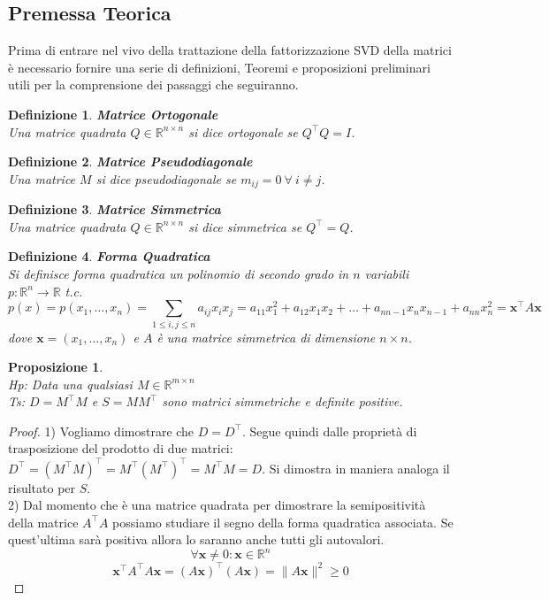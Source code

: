 \documentclass[11pt]{article}
\newtheorem{proposition}{Proposizione}
\newtheorem{definition}{Definizione}
\newcommand{\R}{\mathbb{R}} %
\begin{document}
\subsection{Premessa Teorica}
Prima di entrare nel vivo della trattazione della fattorizzazione SVD della matrici è necessario fornire una serie di definizioni, Teoremi e proposizioni preliminari utili per la comprensione dei passaggi che seguiranno.
\begin{definition}
    \textbf{Matrice Ortogonale}\\ Una matrice quadrata $Q\in\mathbb{R}^{n \times n}$ si dice ortogonale se $Q^\top      Q=I$.
\end{definition}
\begin{definition}
	\textbf{Matrice Pseudodiagonale}\\ Una matrice $M$ si dice pseudodiagonale se $m_{ij}=0 \ \forall \ i\neq j$.
\end{definition}
\begin{definition}
    \textbf{Matrice Simmetrica}\\ Una matrice quadrata $Q\in\mathbb{R}^{n \times n}$ si dice simmetrica se $Q^\top      =Q$.
\end{definition}
\begin{definition}
    \textbf{Forma Quadratica}\\ Si definisce forma quadratica un polinomio di secondo grado in $n$ variabili $p: \mathbb{R}^n \rightarrow \mathbb{R}$ t.c.
    \[
    p(x)=p(x_1,\dots,x_n)=\sum_{1 \leq i,j \leq n}a_{ij}x_ix_j=a_{11}x_1^2+a_{12}x_1x_2 + \dots + a_{nn-1}x_nx_{n-1}+a_{nn}x_n^2=\mathbf{x}^\top      A\mathbf{x}
    \]
    dove $\mathbf{x} = (x_1, \dots, x_n)$ e $A$ è una matrice simmetrica di dimensione $n \times n$.
\end{definition}
\begin{proposition}\label{prop 1}
\textbf{}\\
\textit{Hp:} Data una qualsiasi $M\in\mathbb{R}^{m \times n}$\\
\textit{Ts:} $D=M^\top      M$ e $S=MM^\top      $ sono  matrici simmetriche e definite positive.
\end{proposition}
\begin{proof}
1) Vogliamo dimostrare che $D=D^\top      $. Segue quindi dalle proprietà di trasposizione del prodotto di due matrici: $D^\top      =(M^\top      M)^\top      =M^\top  (M^\top)^\top =M^\top M   =D$. Si dimostra in maniera analoga il risultato per $S$.\\
2) Dal momento che è una matrice quadrata per dimostrare la semipositività della matrice $A^\top      A$  possiamo studiare il segno della forma quadratica associata. Se quest'ultima sarà positiva allora lo saranno anche tutti gli autovalori.\\
$$ \forall \mathbf{x}\neq 0: \mathbf{x} \in \R^n$$ $$\mathbf{x}^\top      A^\top      A\mathbf{x}=(A\mathbf{x})^\top      (A\mathbf{x})= \|A\mathbf{x}\|^2\geq 0$$
\end{proof}
\end{document}
